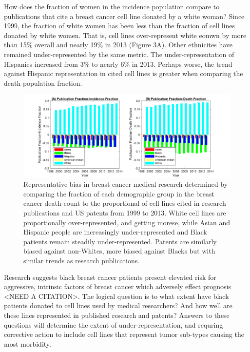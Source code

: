 \documentclass[11pt]{article}
\begin{document}
How does the fraction of women in the incidence population compare to publications that cite a breast cancer cell line donated by a white woman? Since 1999, the fraction of white women has been less than the fraction of cell lines donated by white women. That is, cell lines over-represent white eomwn by more than 15\% overall and nearly 19\% in 2013 (Figure 3A). Other ethnicites have remained under-represented by the same metric. The under-representation of Hispanics increased from 3\% to nearly 6\% in 2013. Perhaps worse, the trend against Hispanic representation in cited cell lines is greater when comparing the death population fraction.

\begin{figure}[h!]
\centering
\includegraphics[width=1\columnwidth, trim = {10cm 0cm 10cm 0cm}, clip]{Figures/Bias.jpg}
\caption{\label{Bias} Representative bias in breast cancer medical research determined by comparing the fraction of each demographic group in the breast cancer death count to the proportional of cell lines cited in research publications and US patents from 1999 to 2013. White cell lines are proportionally over-represented, and getting morese, while Asian and Hispanic people are increasingly under-represented  and Black patients remain steadily under-represented. Patents are similarly biased against non-Whites, more biased against Blacks but with similar trends as research publications.}
\end{figure}


Research suggests black breast cancer patients present elevated risk for aggressive, intrinsic factors of breast cancer which adversely effect prognosis <NEED A CITATION>. The logical question is to what extent have black patients donated to cell lines used by medical researchers? And how well are these lines represented in published research and patents? Answers to these questions will determine the extent of under-representation, and requring corrective action to include cell lines that represent tumor sub-types causing the most morbidity.
\end{document}
